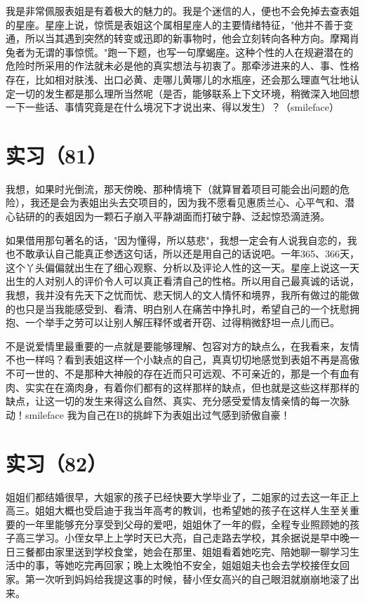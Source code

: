 \documentclass[12pt]{book}
\begin{document}
我是非常佩服表姐是有着极大的魅力的。我是个迷信的人，便也不会免掉去查表姐的星座。星座上说，惊慌是表姐这个属相星座人的主要情绪特征，"他并不善于变通，所以当其遇到突然的转变或迅即的新事物时，他会立刻转向各种方向。摩羯肖兔者为无谓的事惊慌。"跑一下题，也写一句摩蝎座。这种个性的人在规避潜在的危险时所采用的作法就未必是他的真实想法与初衷了。那牵涉进来的人、事、性格存在，比如相对肤浅、出口必黄、走哪儿黄哪儿的水瓶座，还会那么理直气壮地认定一切的发生都是那么理所当然呢（是否，能够联系上下文环境，稍微深入地回想一下一些话、事情究竟是在什么境况下才说出来、得以发生）？（smileface）


\section{实习（81）　}
\label{sec-5-84}

我想，如果时光倒流，那天傍晚、那种情境下（就算冒着项目可能会出问题的危险），我还是会为表姐出头去交项目的，因为我不愿看见惠质兰心、心平气和、潜心钻研的的表姐因为一颗石子崩入平静湖面而打破宁静、泛起惊恐滴涟漪。

如果借用那句著名的话，"因为懂得，所以慈悲"，我想一定会有人说我自恋的，我也不敢承认自己能真正参透这句话，所以还是用自己的话说吧。一年365、366天，这个丫头偏偏就出生在了细心观察、分析以及评论人性的这一天。星座上说这一天出生的人对别人的评价令人可以真正看清自己的性格。所以用自己最真诚的话说，我想，我并没有先天下之忧而忧、悲天悯人的文人情怀和境界，我所有做过的能做的也只是当我能感受到、看清、明白别人在痛苦中挣扎时，希望自己的一个抚慰拥抱、一个举手之劳可以让别人解压释怀或者开窃、过得稍微舒坦一点儿而已。

不是说爱情里最重要的一点就是要能够理解、包容对方的缺点么，在我看来，友情不也一样吗？看到表姐这样一个小缺点的自己，真真切切地感觉到表姐不再是高傲不可一世的、不是那种大神般的存在近而只可远观、不可亲近的，那是一个有血有肉、实实在在滴肉身，有着你们都有的这样那样的缺点，但也就是这些这样那样的缺点，让这一切的发生来得这么自然、真实、充分感受爱情友情亲情的每一次脉动！smileface 我为自己在B的挑衅下为表姐出过气感到骄傲自豪！


\section{实习（82）　}
\label{sec-5-85}

姐姐们都结婚很早，大姐家的孩子已经快要大学毕业了，二姐家的过去这一年正上高三。姐姐大概也受启迪于我当年高考的教训，也希望她的孩子在这样人生至关重要的一年里能够充分享受到父母的爱吧，姐姐休了一年的假，全程专业照顾她的孩子高三学习。小侄女早上上学时天已大亮，自己走路去学校，其余据说是早中晚一日三餐都由家里送到学校食堂，她会在那里、姐姐看着她吃完、陪她聊一聊学习生活中的事，等她吃完再回家；晚上太晚怕不安全，姐姐姐夫也会去学校接侄女回家。第一次听到妈妈给我提这事的时候，替小侄女高兴的自己眼泪就崩崩地滚了出来。
\end{document}

